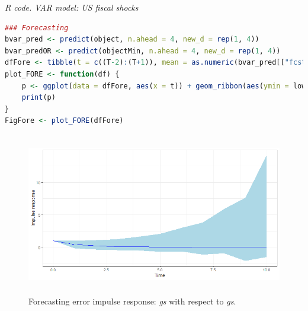 \begin{tcolorbox}[enhanced,width=4.67in,center upper,
	fontupper=\large\bfseries,drop shadow southwest,sharp corners]
	\textit{R code. VAR model: US fiscal shocks}
	\begin{VF}
		\begin{lstlisting}[language=R]
### Forecasting
bvar_pred <- predict(object, n.ahead = 4, new_d = rep(1, 4))
bvar_predOR <- predict(objectMin, n.ahead = 4, new_d = rep(1, 4))
dfFore <- tibble(t = c((T-2):(T+1)), mean = as.numeric(bvar_pred[["fcst"]][["gs"]][,2]), lower = as.numeric(bvar_pred[["fcst"]][["gs"]][,1]), upper = as.numeric(bvar_pred[["fcst"]][["gs"]][,3]), mean1 = as.numeric(bvar_predOR[["fcst"]][["gs"]][,2]), lower1 = as.numeric(bvar_predOR[["fcst"]][["gs"]][,1]), upper1 = as.numeric(bvar_predOR[["fcst"]][["gs"]][,3]), true = as.numeric(Y[c((T-2):(T+1)),2]))
plot_FORE <- function(df) {
	p <- ggplot(data = dfFore, aes(x = t)) + geom_ribbon(aes(ymin = lower, ymax = upper), alpha = 1, fill = "lightblue") + geom_ribbon(aes(ymin = lower1, ymax = upper1), alpha = 1, fill = "blue") + geom_line(aes(y = mean), colour = "green", linewidth = 0.5) + geom_line(aes(y = mean1), colour = "red", linewidth = 0.5) + geom_line(aes(y = true), colour = "black", linewidth = 0.5) + ylab("Forecast") + xlab("Time") + xlim(c((T-2),(T+1)))
	print(p)
}
FigFore <- plot_FORE(dfFore)
\end{lstlisting}
	\end{VF}
\end{tcolorbox} 


\begin{figure}[!h]
	\includegraphics[width=340pt, height=200pt]{Chapters/chapter8/figures/IRsgsgFE.png}
	\caption[List of figure caption goes here]{Forecasting error impulse response: \textit{gs} with respect to \textit{gs}.}\label{fig6}
\end{figure}

